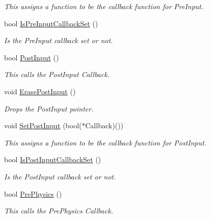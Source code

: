\begin{DoxyCompactItemize}
\begin{DoxyCompactList}\small\item\em This assigns a function to be the callback function for PreInput. \item\end{DoxyCompactList}\item 
bool \hyperlink{classphys_1_1CallBackManager_a1add8e6e7f5862ec4a4fe48095dc3c4e}{IsPreInputCallbackSet} ()
\begin{DoxyCompactList}\small\item\em Is the PreInput callback set or not. \item\end{DoxyCompactList}\item 
bool \hyperlink{classphys_1_1CallBackManager_a83afb36cfc7e71863d68a8b4c1d5e9d2}{PostInput} ()
\begin{DoxyCompactList}\small\item\em This calls the PostInput Callback. \item\end{DoxyCompactList}\item 
void \hyperlink{classphys_1_1CallBackManager_a84ccf382be58b42439869ec9b77a0f89}{ErasePostInput} ()
\begin{DoxyCompactList}\small\item\em Drops the PostInput pointer. \item\end{DoxyCompactList}\item 
void \hyperlink{classphys_1_1CallBackManager_abbf73a7199a64d6a2a39c7de44c5acd6}{SetPostInput} (bool($\ast$Callback)())
\begin{DoxyCompactList}\small\item\em This assigns a function to be the callback function for PostInput. \item\end{DoxyCompactList}\item 
bool \hyperlink{classphys_1_1CallBackManager_a075b799a815a2be2a83e30bb689711a7}{IsPostInputCallbackSet} ()
\begin{DoxyCompactList}\small\item\em Is the PostInput callback set or not. \item\end{DoxyCompactList}\item 
bool \hyperlink{classphys_1_1CallBackManager_a65867cc4855f0f8cd84a2b4a8bbf0fd6}{PrePhysics} ()
\begin{DoxyCompactList}\small\item\em This calls the PrePhysics Callback. \item\end{DoxyCompactList}\item 

\end{DoxyCompactItemize}
